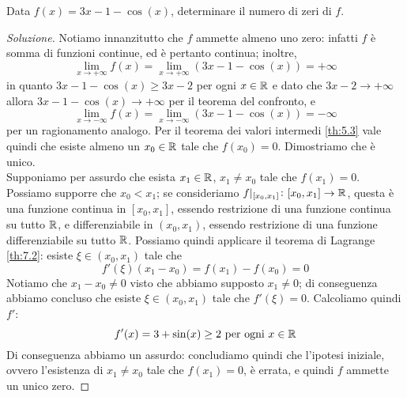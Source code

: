 \begin{exercise}
    \label{ex:7.2}
    Data $f(x) = 3x-1-\cos(x)$, determinare il numero di zeri di $f$.
\end{exercise}
\begin{proof}[Soluzione]
    Notiamo innanzitutto che $f$ ammette almeno uno zero: infatti $f$ è somma di funzioni continue, ed è pertanto continua; inoltre,
    \[
    \lim_{x\to+\infty}f(x) = \lim_{x\to +\infty}(3x-1-\cos(x)) = +\infty 
    \]
    in quanto $3x-1-\cos(x)\ge 3x-2$ per ogni $x\in \amsbb{R}$ e dato che $3x-2\to +\infty$ allora $3x-1-\cos(x)\to+\infty$ per il teorema del confronto, e
    \[
    \lim_{x\to-\infty}f(x) = \lim_{x\to -\infty}(3x-1-\cos(x)) = -\infty 
    \]
    per un ragionamento analogo. Per il teorema dei valori intermedi \ref{th:5.3} vale quindi che esiste almeno un $x_0\in\amsbb{R}$ tale che $f(x_0) = 0$. Dimostriamo che è unico.\\
    Supponiamo per assurdo che esista $x_1\in\amsbb{R}$, $x_1 \ne x_0$ tale che $f(x_1)=0$. Possiamo supporre che $x_0<x_1$; se consideriamo $f|_{[x_0, x_1]}\colon [x_0, x_1]\to\amsbb{R}$, questa è una funzione continua in $[x_0, x_1]$, essendo restrizione di una funzione continua su tutto $\amsbb{R}$, e differenziabile in $(x_0, x_1)$, essendo restrizione di una funzione differenziabile su tutto $\amsbb{R}$. Possiamo quindi applicare il teorema di Lagrange \ref{th:7.2}: esiste $\xi\in(x_0, x_1)$ tale che
    \[
    f'(\xi)(x_1 - x_0) = f(x_1)-f(x_0) = 0
    \]
    Notiamo che $x_1-x_0\ne0$ visto che abbiamo supposto $x_1 \ne 0$; di conseguenza abbiamo concluso che esiste $\xi\in(x_0, x_1)$ tale che $f'(\xi) = 0$. Calcoliamo quindi $f'$:
    \[
    f'(x) = 3+\sin(x) \ge 2 \ \text{per ogni} \ x\in\amsbb{R}
    \]
    Di conseguenza abbiamo un assurdo: concludiamo quindi che l'ipotesi iniziale, ovvero l'esistenza di $x_1\ne x_0$ tale che $f(x_1)=0$, è errata, e quindi $f$ ammette un unico zero.
\end{proof}
